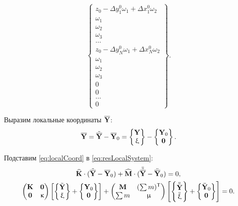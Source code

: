 \begin{equation*}
\begin{Bmatrix}
		z_0 -\Delta y_1^0 \omega_1 + \Delta x_1^0 \omega_2 \\
		\omega_1 \\
		\omega_2	\\
		\omega_3 \\
		\hdots \\
		z_0 -\Delta y_N^0 \omega_1 + \Delta x_N^0 \omega_2 \\
		\omega_1 \\
		\omega_2 \\
		\omega_3 \\
		0 \\
		0 \\
		\hdots \\
		0
	 \end{Bmatrix}.
\end{equation*}

Выразим локальные координаты $ \overline{\mathbf{Y}} $:
\begin{equation}
	\overline{\mathbf{Y}} = \tilde{\overline{\mathbf{Y}}} - \overline{\mathbf{Y}}_0 = \begin{Bmatrix}	\mathbf{Y} \\ \upxi \end{Bmatrix} -
\begin{Bmatrix} \mathbf{Y}_0 \\ \mathbf{0} \end{Bmatrix}.
	\label{eq:localCoord}
\end{equation}

Подставим \eqref{eq:localCoord} в \eqref{eq:resLocalSystem}:
\begin{gather}
	\widehat{\mathbf{K}} \cdot (\tilde{\overline{\mathbf{Y}}} - \overline{\mathbf{Y}}_0) + \widehat{\mathbf{M}} \cdot  (\ddot{\tilde{\overline{\mathbf{Y}}}} - \ddot{\overline{\mathbf{Y}}}_0) = 0, \\
	\begin{pmatrix}
		\mathbf{K} & \mathbf{0} \\
		\mathbf{0} & \upkappa
	\end{pmatrix}
	\left[
	\begin{Bmatrix}
		\tilde{\mathbf{Y}} \\
		\upxi
	\end{Bmatrix}
	+
	\begin{Bmatrix}
		\mathbf{Y}_0 \\
		\mathbf{0}
	\end{Bmatrix}
	\right]
	+
	\begin{pmatrix}
	\mathbf{M} & (\sum m) ^ \mathsf{T} \\
	\sum m & \upmu
	\end{pmatrix}
	\left[
	\begin{Bmatrix}
		\ddot{\tilde{\mathbf{Y}}} \\
		\ddot{\upxi}
	\end{Bmatrix}
	+
	\begin{Bmatrix}
		\ddot{\mathbf{Y}}_0 \\
		\mathbf{0}
	\end{Bmatrix}
	\right] = 0 \nonumber.
\end{gather}

